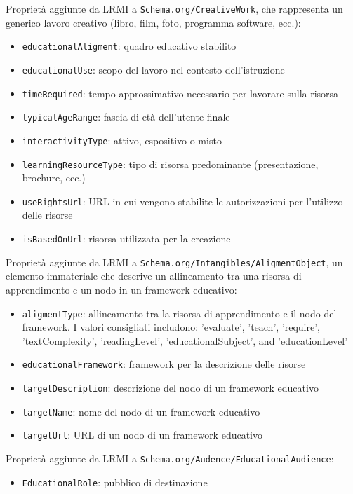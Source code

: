 Proprietà aggiunte da LRMI a \texttt{Schema.org/CreativeWork}, che rappresenta un generico lavoro creativo (libro, film, foto, programma software, ecc.):
\begin{itemize}
\item \texttt{educationalAligment}: quadro educativo stabilito
\item \texttt{educationalUse}: scopo del lavoro nel contesto dell'istruzione
\item \texttt{timeRequired}: tempo approssimativo necessario per lavorare sulla risorsa
\item \texttt{typicalAgeRange}: fascia di età dell'utente finale
\item \texttt{interactivityType}: attivo, espositivo o misto
\item \texttt{learningResourceType}: tipo di risorsa predominante (presentazione, brochure, ecc.)
\item \texttt{useRightsUrl}: URL in cui vengono stabilite le autorizzazioni per l'utilizzo delle risorse
\item \texttt{isBasedOnUrl}: risorsa utilizzata per la creazione
\end{itemize}

Proprietà aggiunte da LRMI a \texttt{Schema.org/Intangibles/AligmentObject}, un elemento immateriale che descrive un allineamento tra una risorsa di apprendimento e un nodo in un framework educativo:
\begin{itemize}
\item \texttt{aligmentType}: allineamento tra la risorsa di apprendimento e il nodo del framework. I valori consigliati includono: 'evaluate', 'teach', 'require', 'textComplexity', 'readingLevel', 'educationalSubject', and 'educationLevel'
\item \texttt{educationalFramework}: framework per la descrizione delle risorse
\item \texttt{targetDescription}: descrizione del nodo di un framework educativo
\item \texttt{targetName}: nome del nodo di un framework educativo
\item \texttt{targetUrl}: URL di un nodo di un framework educativo
\end{itemize}

Proprietà aggiunte da LRMI a \texttt{Schema.org/Audence/EducationalAudience}:
\begin{itemize}
\item \texttt{EducationalRole}: pubblico di destinazione
\end{itemize}

